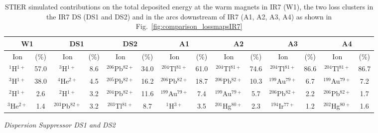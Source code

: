 \begin{table*}[t]
\caption{STIER simulated contributions on the total deposited energy at the warm magnets in IR7 (W1), the two loss clusters in the IR7 DS (DS1 and DS2) and in the arcs downstream of IR7 (A1, A2, A3, A4) as shown in Fig.~\ref{fig:comparison_lossmapsIR7} }
\small
\setlength\tabcolsep{2.5pt}
\centering
\label{tab:contrib}
\begin{tabular}{cc|cc|cc|cc|cc|cc|cc}
\toprule
\multicolumn{2}{c}{W1}                 & \multicolumn{2}{c}{DS1}                 & \multicolumn{2}{c}{DS2}         & \multicolumn{2}{c}{A1}                 & \multicolumn{2}{c}{A2}                 & \multicolumn{2}{c}{A3}                 & \multicolumn{2}{c}{A4}                    \\ \midrule
Ion            &  (\%) & Ion            &  (\%) & Ion  & (\%)   &   Ion            &  (\%) & Ion            &  (\%) & Ion            &  (\%) & Ion            &  (\%) \\ \midrule
$^{1}$H$^{1+}$ & 57.0              & $^{3}$H$^{1+}$ & 8.6              & $^{206}$Pb$^{82+}$ & 34.0            & $^{204}$Tl$^{81+}$ & 61.0              & $^{204}$Tl$^{81+}$ & 74.6              & $^{204}$Tl$^{81+}$ & 86.6              & $^{204}$Tl$^{81+}$ & 86.7              \\

$^{3}$H$^{1+}$ & 38.0              & $^{4}$He$^{2+}$ & 4.5              & $^{205}$Pb$^{82+}$ & 16.2          & $^{206}$Pb$^{82+}$ & 18.7              & $^{206}$Pb$^{82+}$ & 10.3              & $^{199}$Au$^{79+}$ & 6.7               & $^{199}$Au$^{79+}$ & 7.2               \\

$^{2}$H$^{1+}$ & 2.6               & $^{2}$H$^{1+}$ & 3.2               & $^{204}$Pb$^{82+}$ & 11.6            & $^{199}$Au$^{79+}$ & 7.4               & $^{199}$Au$^{79+}$ & 5.7               & $^{206}$Pb$^{82+}$ & 2.2               & $^{206}$Pb$^{82+}$ & 1.7               \\

$^{3}$He$^{2+}$     & 1.4               & $^{203}$Pb$^{82+}$ & 3.2               & $^{203}$Tl$^{81+}$ & 8.7         & $^{1}$H$^{3+}$     & 3.5               & $^{201}$Hg$^{80+}$ & 2.3               & $^{194}$Ir$^{77+}$ & 1.2               & $^{202}$Hg$^{80+}$ & 1.6              
\\ \bottomrule             
\end{tabular}
\end{table*}

\newpage
\textit{Dispersion Suppressor DS1 and DS2}

